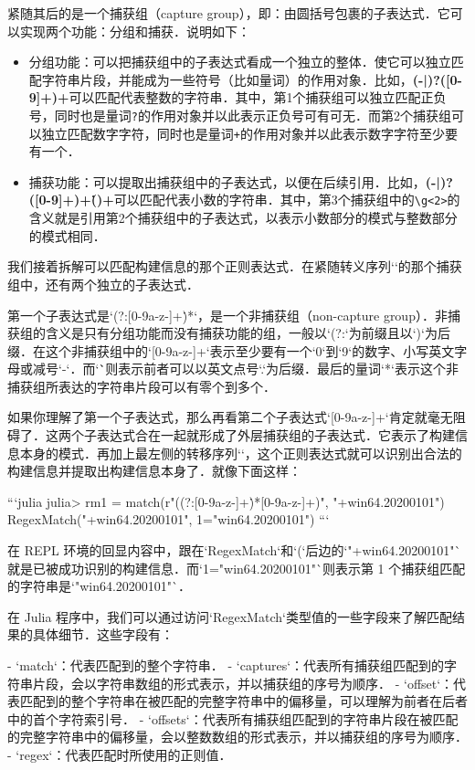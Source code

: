 紧随其后的是一个捕获组（capture group），即：由圆括号包裹的子表达式．它可以实现两个功能：分组和捕获．说明如下：

\begin{itemize}
\item 分组功能：可以把捕获组中的子表达式看成一个独立的整体．使它可以独立匹配字符串片段，并能成为一些符号（比如量词）的作用对象．比如，\textbf{(-|\+)?([0-9]+)+}可以匹配代表整数的字符串．其中，第1个捕获组可以独立匹配正负号，同时也是量词\verb|?|的作用对象并以此表示正负号可有可无．而第2个捕获组可以独立匹配数字字符，同时也是量词\verb|+|的作用对象并以此表示数字字符至少要有一个．
\item 捕获功能：可以提取出捕获组中的子表达式，以便在后续引用．比如，\textbf{(-|\+)?([0-9]+)+\.()+}可以匹配代表小数的字符串．其中，第3个捕获组中的\verb|\g<2>|的含义就是引用第2个捕获组中的子表达式，以表示小数部分的模式与整数部分的模式相同．
\end{itemize}

我们接着拆解可以匹配构建信息的那个正则表达式．在紧随转义序列`\+`的那个捕获组中，还有两个独立的子表达式．

第一个子表达式是`(?:[0-9a-z-]+\.)*`，是一个非捕获组（non-capture group）．非捕获组的含义是只有分组功能而没有捕获功能的组，一般以`(?:`为前缀且以`)`为后缀．在这个非捕获组中的`[0-9a-z-]+`表示至少要有一个`0`到`9`的数字、小写英文字母或减号`-`．而`\.`则表示前者可以以英文点号`.`为后缀．最后的量词`*`表示这个非捕获组所表达的字符串片段可以有零个到多个．

如果你理解了第一个子表达式，那么再看第二个子表达式`[0-9a-z-]+`肯定就毫无阻碍了．这两个子表达式合在一起就形成了外层捕获组的子表达式．它表示了构建信息本身的模式．再加上最左侧的转移序列`\+`，这个正则表达式就可以识别出合法的构建信息并提取出构建信息本身了．就像下面这样：

```julia
julia> rm1 = match(r"\+((?:[0-9a-z-]+\.)*[0-9a-z-]+)", "+win64.20200101")
RegexMatch("+win64.20200101", 1="win64.20200101")
```

在 REPL 环境的回显内容中，跟在`RegexMatch`和`(`后边的`"+win64.20200101"`就是已被成功识别的构建信息．而`1="win64.20200101"`则表示第 1 个捕获组匹配的字符串是`"win64.20200101"`．

在 Julia 程序中，我们可以通过访问`RegexMatch`类型值的一些字段来了解匹配结果的具体细节．这些字段有：

- `match`：代表匹配到的整个字符串．
- `captures`：代表所有捕获组匹配到的字符串片段，会以字符串数组的形式表示，并以捕获组的序号为顺序．
- `offset`：代表匹配到的整个字符串在被匹配的完整字符串中的偏移量，可以理解为前者在后者中的首个字符索引号．
- `offsets`：代表所有捕获组匹配到的字符串片段在被匹配的完整字符串中的偏移量，会以整数数组的形式表示，并以捕获组的序号为顺序．
- `regex`：代表匹配时所使用的正则值．

